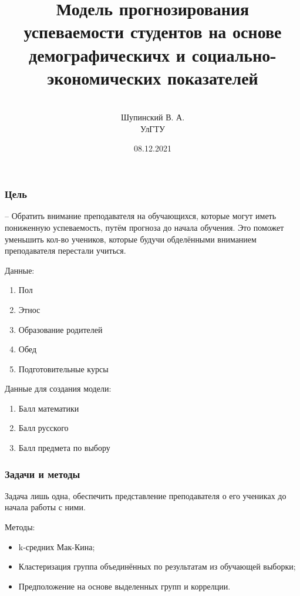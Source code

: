 \documentclass[
	fullscreen=true, 
	bookmarks=false,
	sans serif,
	9pt,
	pdf,
	hyperref={
		pdfpagelabels=false,
		unicode=true
	}
]{beamer}
\title{
	Модель прогнозирования успеваемости студентов на основе демографическичх и социально-экономических показателей
}
\author{
	\vspace{0.5cm}\\
	\large
    Шупинский В. А.\\
	\vspace{0.1cm}
	УлГТУ\\
	\vspace{2cm}
}
\institute{}
\date{08.12.2021}
\begin{document}
	
	\begin{frame}
		\titlepage
	\end{frame}	
		
	\section{}
	\subsection{}
		
	\begin{frame}\frametitle{Цель}
		– Обратить внимание преподавателя на обучающихся, которые могут иметь пониженную успеваемость, путём прогноза до начала обучения. Это поможет уменьшить кол-во учеников, которые будучи обделёнными вниманием преподавателя перестали учиться.
		\newline
		
		Данные:
		\begin{enumerate}
			\item Пол
			\item Этнос
			\item Образование родителей
			\item Обед
			\item Подготовительные курсы
		\end{enumerate}
		Данные для создания модели:
		\begin{enumerate}
			\item Балл математики
			\item Балл русского
			\item Балл предмета по выбору 
		\end{enumerate}
	\end{frame}

	\begin{frame}\frametitle{Задачи и методы}
		Задача лишь одна, обеспечить представление преподавателя о его учениках до начала работы с ними.
		\newline
		
		Методы:
		\begin{itemize}
			\item k-средних Мак-Кина;
			\item Кластеризация группа объединённых по результатам из обучающей выборки;
			\item Предположение на основе выделенных групп и коррелции.
		\end{itemize}
	\end{frame}
\end{document}
